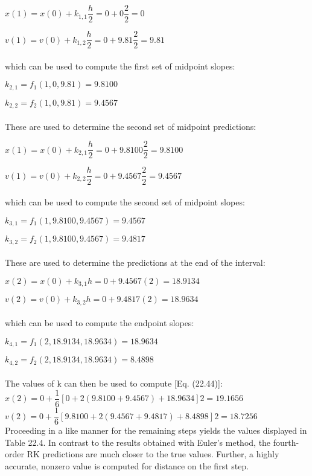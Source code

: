 \documentclass[../main.tex]{subfiles}
\begin{document}
$x(1) = x(0) + k_{1,1}\dfrac{h}{2} = 0 + 0\dfrac{2}{2} = 0$

$v(1) = v(0) + k_{1,2} \dfrac{h}{2} = 0 + 9.81\dfrac{2}{2} = 9.81$\\
\\
which can be used to compute the first set of midpoint slopes:

$k_{2,1} = f_1(1,0,9.81) = 9.8100$

$k_{2,2} = f_2(1,0,9.81) = 9.4567$\\
\\
These are used to determine the second set of midpoint predictions:

$x(1) = x(0) + k_{2,1} \dfrac{h}{2} = 0 + 9.8100 \dfrac{2}{2} = 9.8100$

$v(1) = v(0) + k_{2,2} \dfrac{h}{2} = 0 + 9.4567 \dfrac{2}{2} = 9.4567$\\
\\
which can be used to compute the second set of midpoint slopes:

$k_{3,1} = f_1(1, 9.8100, 9.4567) = 9.4567$

$k_{3,2} = f_2(1, 9.8100, 9.4567) = 9.4817$\\
\\
These are used to determine the predictions at the end of the interval:

$x(2) = x(0) + k_{3,1}h = 0 + 9.4567(2) = 18.9134$

$v(2) = v(0) + k_{3,2}h = 0 + 9.4817(2) = 18.9634$\\
\\
which can be used to compute the endpoint slopes:

$k_{4,1} = f_1(2, 18.9134, 18.9634) = 18.9634$

$k_{4,2} = f_2(2, 18.9134, 18.9634) = 8.4898$\\
\\
The values of k can then be used to compute [Eq. (22.44)]:\\

$ x(2) = 0 + \dfrac{1}{6} [0 + 2(9.8100 + 9.4567) + 18.9634] 2 = 19.1656$\\

$ v(2) = 0 + \dfrac{1}{6} [9.8100 + 2(9.4567 + 9.4817) + 8.4898] 2 = 18.7256$\\

Proceeding in a like manner for the remaining steps yields the values displayed in
Table 22.4. In contrast to the results obtained with Euler's method, the fourth-order RK
predictions are much closer to the true values. Further, a highly accurate, nonzero value is
computed for distance on the first step.
\end{document}
